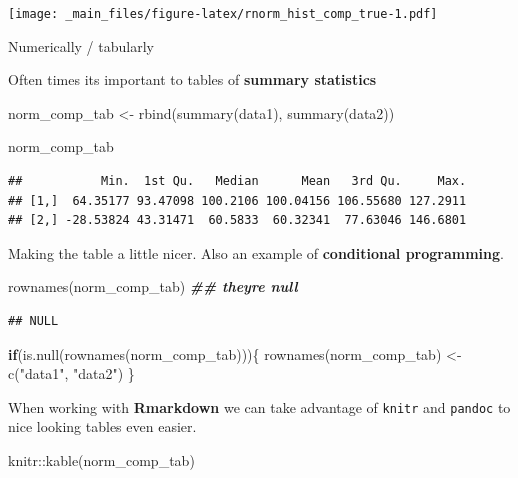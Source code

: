 \documentclass[
]{book}
\newenvironment{Shaded}{\begin{snugshade}}{\end{snugshade}}
\newcommand{\ControlFlowTok}[1]{\textcolor[rgb]{0.13,0.29,0.53}{\textbf{#1}}}
\newcommand{\DocumentationTok}[1]{\textcolor[rgb]{0.56,0.35,0.01}{\textbf{\textit{#1}}}}
\newcommand{\FunctionTok}[1]{\textcolor[rgb]{0.00,0.00,0.00}{#1}}
\newcommand{\NormalTok}[1]{#1}
\newcommand{\OtherTok}[1]{\textcolor[rgb]{0.56,0.35,0.01}{#1}}
\newcommand{\SpecialCharTok}[1]{\textcolor[rgb]{0.00,0.00,0.00}{#1}}
\newcommand{\StringTok}[1]{\textcolor[rgb]{0.31,0.60,0.02}{#1}}
\begin{document}
\texttt{[image: \_main\_files/figure-latex/rnorm\_hist\_comp\_true-1.pdf]}

Numerically / tabularly

Often times its important to tables of \textbf{summary statistics}

\begin{Shaded}
\begin{Highlighting}[]
\NormalTok{norm\_comp\_tab }\OtherTok{\textless{}{-}} \FunctionTok{rbind}\NormalTok{(}\FunctionTok{summary}\NormalTok{(data1),}
                       \FunctionTok{summary}\NormalTok{(data2))}

\NormalTok{norm\_comp\_tab}
\end{Highlighting}
\end{Shaded}

\begin{verbatim}
##           Min.  1st Qu.   Median      Mean   3rd Qu.     Max.
## [1,]  64.35177 93.47098 100.2106 100.04156 106.55680 127.2911
## [2,] -28.53824 43.31471  60.5833  60.32341  77.63046 146.6801
\end{verbatim}

Making the table a little nicer. Also an example of \textbf{conditional programming}.

\begin{Shaded}
\begin{Highlighting}[]
\FunctionTok{rownames}\NormalTok{(norm\_comp\_tab) }\DocumentationTok{\#\# they\textquotesingle{}re null}
\end{Highlighting}
\end{Shaded}

\begin{verbatim}
## NULL
\end{verbatim}

\begin{Shaded}
\begin{Highlighting}[]
\ControlFlowTok{if}\NormalTok{(}\FunctionTok{is.null}\NormalTok{(}\FunctionTok{rownames}\NormalTok{(norm\_comp\_tab)))\{}
  \FunctionTok{rownames}\NormalTok{(norm\_comp\_tab) }\OtherTok{\textless{}{-}} \FunctionTok{c}\NormalTok{(}\StringTok{"data1"}\NormalTok{, }\StringTok{"data2"}\NormalTok{)}
\NormalTok{\}}
\end{Highlighting}
\end{Shaded}

When working with \textbf{Rmarkdown} we can take advantage of \texttt{knitr} and \texttt{pandoc} to nice looking tables even easier.

\begin{Shaded}
\begin{Highlighting}[]
\NormalTok{knitr}\SpecialCharTok{::}\FunctionTok{kable}\NormalTok{(norm\_comp\_tab)}
\end{Highlighting}
\end{Shaded}
\end{document}

